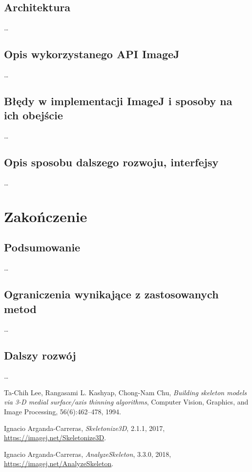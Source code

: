 \documentclass[declaration,shortabstract,mgr]{iithesis}
\begin{document}
\section{Architektura}
\ldots %
\section{Opis wykorzystanego API ImageJ}
\ldots %
\section{Błędy w implementacji ImageJ i sposoby na ich obejście}
\ldots %
\section{Opis sposobu dalszego rozwoju, interfejsy}
\ldots %





\chapter{Zakończenie}

\section{Podsumowanie}
\ldots %
\section{Ograniczenia wynikające z zastosowanych metod}
\ldots %
\section{Dalszy rozwój}
\ldots %







\begin{thebibliography}{1}

  Ta-Chih Lee, Rangasami L. Kashyap, Chong-Nam Chu,
  \emph{Building skeleton models via 3-D medial surface/axis thinning algorithms},
  Computer Vision, Graphics, and Image Processing,
  56(6):462–478,
  1994.

  Ignacio Arganda-Carreras,
  \emph{Skeletonize3D},
  2.1.1,
  2017,
  \url{https://imagej.net/Skeletonize3D}.

  Ignacio Arganda-Carreras,
  \emph{AnalyzeSkeleton},
  3.3.0,
  2018,
  \url{https://imagej.net/AnalyzeSkeleton}.

\end{thebibliography}
\end{document}

